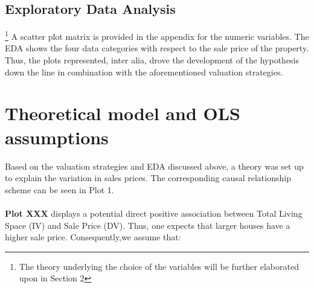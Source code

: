 \documentclass{article}
\begin{document}
\subsection{Exploratory Data Analysis}\footnote{The theory underlying the choice of the variables will be further elaborated upon in Section 2}
A scatter plot matrix is provided in the appendix for the numeric variables. The EDA shows the four data categories with respect to the sale price of the property. Thus, the plots represented, inter alia, drove the development of the hypothesis down the line in combination with the aforementioned valuation strategies. 

\section{Theoretical model and OLS assumptions}




\begin{center}
\end{center}


\indent Based on the valuation strategies and EDA discussed above, a theory was set up to explain the variation in sales prices. The corresponding causal relationship scheme can be seen in Plot 1. 

\indent \paragraph{} \textbf{Plot XXX} displays a potential direct positive association between Total Living Space (IV) and Sale Price (DV). Thus, one expects that larger houses have a higher sale price. Consequently,we assume that:
\end{document}
